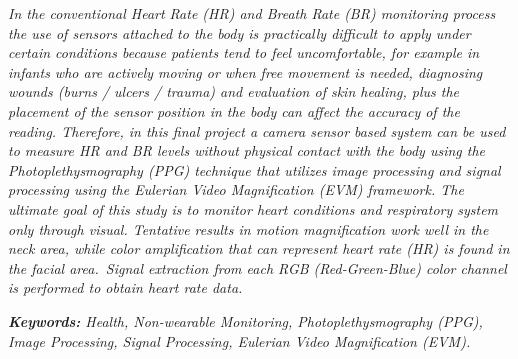 
\begin{abstract_en}

\textit{In the conventional \textit{Heart Rate} (HR) and \textit{Breath Rate} (BR) monitoring process the use of sensors attached to the body is practically difficult to apply under certain conditions because patients tend to feel uncomfortable, for example in infants who are actively moving or when free movement is needed, diagnosing wounds (burns / ulcers / trauma) and evaluation of skin healing, plus the placement of the sensor position in the body can affect the accuracy of the reading. Therefore, in this final project a camera sensor based system can be used to measure HR and BR levels without physical contact with the body using the Photoplethysmography (PPG) technique that utilizes image processing and signal processing using the Eulerian Video Magnification (EVM) framework. The ultimate goal of this study is to monitor heart conditions and respiratory system only through visual. Tentative results in motion magnification work well in the neck area, while color amplification that can represent heart rate (HR) is found in the facial area.~Signal extraction from each RGB (Red-Green-Blue) color channel is performed to obtain heart rate data.}

{\noindent \textit{\textbf{Keywords:} Health, Non-wearable Monitoring, Photoplethysmography (PPG), Image Processing, Signal Processing, Eulerian Video Magnification (EVM).}}
\end{abstract_en}
